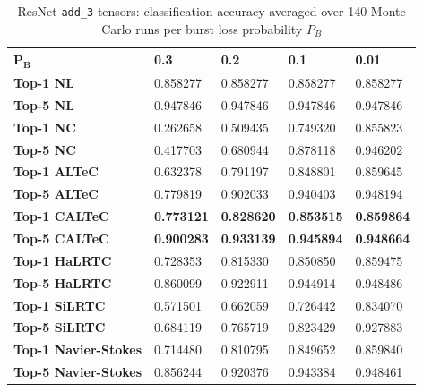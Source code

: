 \documentclass[conference,letterpaper]{IEEEtran}
\begin{document}
\begin{table}[t]
\caption{ResNet \texttt{add\_3} tensors: classification accuracy averaged over 140 Monte Carlo runs per burst loss probability $P_B$}
\label{table:resnet34}
\begin{tabular}{|l|llll|}
\hline
$\mathbf{P_B}$      & \textbf{0.3}  & \textbf{0.2}  & \textbf{0.1}   & \textbf{0.01}     \\
\hline
\textbf{Top-1 NL}   & 0.858277 & 0.858277 & 0.858277 & 0.858277 \\
\textbf{Top-5 NL}   & 0.947846 & 0.947846 & 0.947846 & 0.947846 \\
\hline
\textbf{Top-1 NC}   & 0.262658 & 0.509435 & 0.749320 & 0.855823 \\
\textbf{Top-5 NC}   & 0.417703 & 0.680944 & 0.878118 & 0.946202 \\
\hline
\textbf{Top-1 ALTeC} & 0.632378 & 0.791197 & 0.848801 & 0.859645 \\
\textbf{Top-5 ALTeC} & 0.779819 & 0.902033 & 0.940403 & 0.948194 \\
\hline
\textbf{Top-1 CALTeC} & \textbf{0.773121} & \textbf{0.828620} & \textbf{0.853515} & \textbf{0.859864} \\
\textbf{Top-5 CALTeC} & \textbf{0.900283} & \textbf{0.933139} & \textbf{0.945894} & \textbf{0.948664} \\
\hline
\textbf{Top-1 HaLRTC} & 0.728353 & 0.815330 & 0.850850 & 0.859475 \\
\textbf{Top-5 HaLRTC} & 0.860099 & 0.922911 & 0.944914 & 0.948486 \\
\hline
\textbf{Top-1 SiLRTC}  & 0.571501 & 0.662059 & 0.726442 & 0.834070 \\
\textbf{Top-5 SiLRTC}  & 0.684119 & 0.765719 & 0.823429 & 0.927883 \\
\hline
\textbf{Top-1 Navier-Stokes} & 0.714480 & 0.810795 & 0.849652 & 0.859840 \\
\textbf{Top-5 Navier-Stokes} & 0.856244 & 0.920376 & 0.943384 & 0.948461 \\
\hline
\end{tabular}
\end{table}
\end{document}
